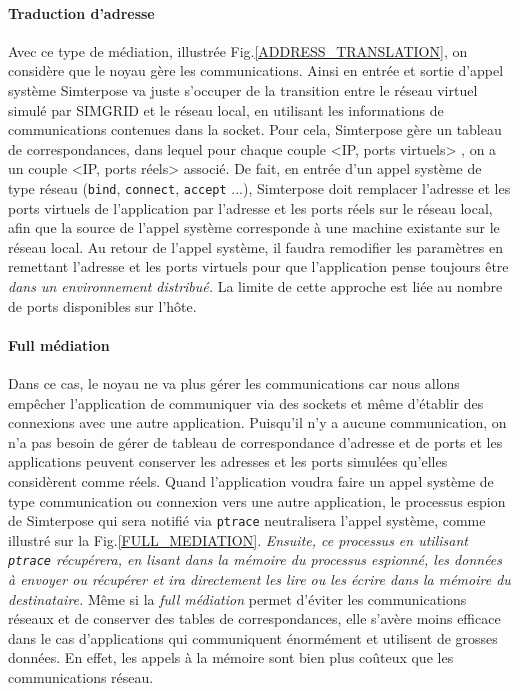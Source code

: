 \paragraph{Traduction d'adresse}
 Avec ce type de médiation, illustrée Fig.\ref{ADDRESS_TRANSLATION}, on considère
 que le noyau gère les communications. Ainsi en entrée et sortie d'appel système
 Simterpose va juste s'occuper de la transition entre le réseau virtuel simulé
 par SIMGRID et le réseau local, en utilisant les informations de communications
 contenues dans la socket. Pour cela, Simterpose gère un tableau de
 correspondances, dans lequel pour chaque couple <IP, ports virtuels> , on a un
 couple <IP, ports réels> associé.  De fait, en entrée d'un appel système de
 type réseau (\texttt{bind}, \texttt{connect}, \texttt{accept} ...), Simterpose
 doit remplacer l'adresse et les ports virtuels de l'application par l'adresse
 et les ports réels sur le réseau local, afin que la source de l'appel système
 corresponde à une machine existante sur le réseau local. Au retour de l'appel
 système, il faudra remodifier les paramètres en remettant l'adresse et les
 ports virtuels pour que l'application pense toujours être \textit{dans un
   environnement distribué.}  La limite de cette approche est liée au nombre de
 ports disponibles sur l'hôte.

\paragraph{Full médiation} 
Dans ce cas, le noyau ne va plus gérer les communications car nous allons
empêcher l'application de communiquer via des sockets et même d'établir des
connexions avec une autre application. Puisqu'il n'y a aucune communication, on
n'a pas besoin de gérer de tableau de correspondance d'adresse et de ports et
les applications peuvent conserver les adresses et les ports simulées qu'elles
considèrent comme réels. Quand l'application voudra faire un appel système de
type communication ou connexion vers une autre application, le processus espion
de Simterpose qui sera notifié via \texttt{ptrace} neutralisera l'appel système,
comme illustré sur la Fig.\ref{FULL_MEDIATION}. \textit{Ensuite, ce processus en
  utilisant \texttt{ptrace} récupérera, en lisant dans la mémoire du processus
  espionné, les données à envoyer ou récupérer et ira directement les lire ou
  les écrire dans la mémoire du destinataire.}  Même si la \textit{full
  médiation} permet d'éviter les communications réseaux et de conserver des
tables de correspondances, elle s'avère moins efficace dans le cas
d'applications qui communiquent énormément et utilisent de grosses données. En
effet, les appels à la mémoire sont bien plus coûteux que les communications
réseau.

